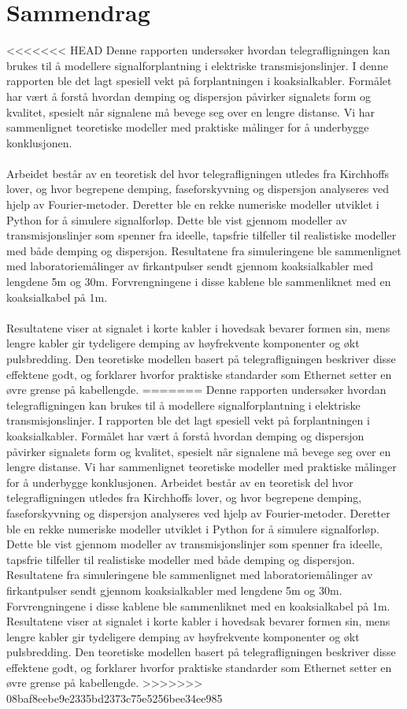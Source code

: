 \section*{Sammendrag}
<<<<<<< HEAD
Denne rapporten undersøker hvordan telegrafligningen kan brukes til å modellere signalforplantning i elektriske transmisjonslinjer. I denne rapporten ble det lagt spesiell vekt på forplantningen i koaksialkabler. Formålet har vært å forstå hvordan demping og dispersjon påvirker signalets form og kvalitet, spesielt når signalene må bevege seg over en lengre distanse. Vi har sammenlignet teoretiske modeller med praktiske målinger for å underbygge konklusjonen. 
\\
\\Arbeidet består av en teoretisk del hvor telegrafligningen utledes fra Kirchhoffs lover, og hvor begrepene demping, faseforskyvning og dispersjon analyseres ved hjelp av Fourier-metoder. Deretter ble en rekke numeriske modeller utviklet i Python for å simulere signalforløp. Dette ble vist gjennom modeller av transmisjonslinjer som spenner fra ideelle, tapsfrie tilfeller til realistiske modeller med både demping og dispersjon. Resultatene fra simuleringene ble sammenlignet med laboratoriemålinger av firkantpulser sendt gjennom koaksialkabler med lengdene 5m og 30m. Forvrengningene i disse kablene ble sammenliknet med en koaksialkabel på 1m.
\\
\\Resultatene viser at signalet i korte kabler i hovedsak bevarer formen sin, mens lengre kabler gir tydeligere demping av høyfrekvente komponenter og økt pulsbredding. Den teoretiske modellen basert på telegrafligningen beskriver disse effektene godt, og forklarer hvorfor praktiske standarder som Ethernet setter en øvre grense på kabellengde.
=======
Denne rapporten undersøker hvordan telegrafligningen kan brukes til å modellere signalforplantning i elektriske transmisjonslinjer. I rapporten ble det lagt spesiell vekt på forplantningen i koaksialkabler. Formålet har vært å forstå hvordan demping og dispersjon påvirker signalets form og kvalitet, spesielt når signalene må bevege seg over en lengre distanse. Vi har sammenlignet teoretiske modeller med praktiske målinger for å underbygge konklusjonen. 
Arbeidet består av en teoretisk del hvor telegrafligningen utledes fra Kirchhoffs lover, og hvor begrepene demping, faseforskyvning og dispersjon analyseres ved hjelp av Fourier-metoder. Deretter ble en rekke numeriske modeller utviklet i Python for å simulere signalforløp. Dette ble vist gjennom modeller av transmisjonslinjer som spenner fra ideelle, tapsfrie tilfeller til realistiske modeller med både demping og dispersjon. Resultatene fra simuleringene ble sammenlignet med laboratoriemålinger av firkantpulser sendt gjennom koaksialkabler med lengdene 5m og 30m. Forvrengningene i disse kablene ble sammenliknet med en koaksialkabel på 1m.
Resultatene viser at signalet i korte kabler i hovedsak bevarer formen sin, mens lengre kabler gir tydeligere demping av høyfrekvente komponenter og økt pulsbredding. Den teoretiske modellen basert på telegrafligningen beskriver disse effektene godt, og forklarer hvorfor praktiske standarder som Ethernet setter en øvre grense på kabellengde.
>>>>>>> 08baf8eebe9e2335bd2373c75e5256bee34ee985

